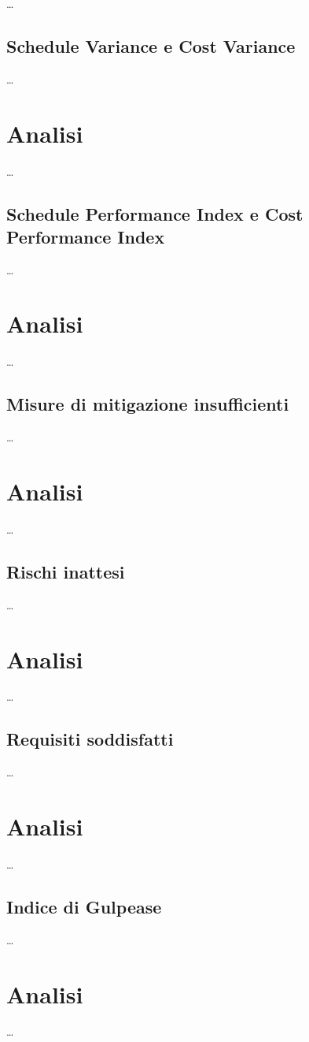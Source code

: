 \dots



\subsection{Schedule Variance e Cost Variance}

\dots

\section*{Analisi}

\dots



\subsection{Schedule Performance Index e Cost Performance Index}

\dots

\section*{Analisi}

\dots



\subsection{Misure di mitigazione insufficienti}

\dots

\section*{Analisi}

\dots



\subsection{Rischi inattesi}

\dots

\section*{Analisi}

\dots



\subsection{Requisiti soddisfatti}

\dots

\section*{Analisi}

\dots



\subsection{Indice di Gulpease}

\dots

\section*{Analisi}

\dots